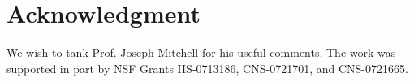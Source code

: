 \documentclass[conference]{IEEEtran}
\theoremstyle{definition}
\newtheorem*{NP-Hardness of Approximating the SODkC Problem}{NP-Hardness of Approximating the SODkC Problem}
\newtheorem*{Greedy Algorithm (GA)}{Greedy Algorithm (GA)}
\newtheorem*{GA on the Running Example}{GA on the Running Example}
\newtheorem*{Performance Guarantee of GA}{Performance Guarantee of GA}
\begin{document}
\section*{Acknowledgment}
We wish to tank Prof. Joseph Mitchell for his useful
comments. The work was supported in part by NSF
Grants IIS-0713186, CNS-0721701, and CNS-0721665.







%
%
%


% 
% 







\end{document}
